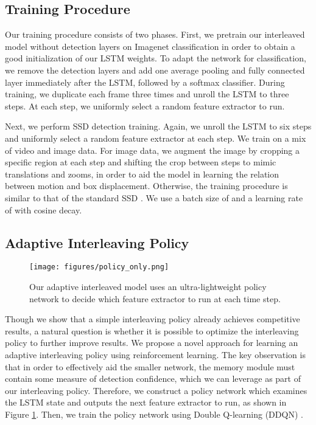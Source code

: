\documentclass[10pt,twocolumn,letterpaper]{article}
\begin{document}
\subsection{Training Procedure}
Our training procedure consists of two phases. First, we pretrain our interleaved model without detection layers on Imagenet classification in order to obtain a good initialization of our LSTM weights. To adapt the network for classification, we remove the detection layers  and add one average pooling and fully connected layer immediately after the LSTM, followed by a softmax classifier. During training, we duplicate each frame three times and unroll the LSTM to three steps. At each step, we uniformly select a random feature extractor to run.

Next, we perform SSD detection training. Again, we unroll the LSTM to six steps and uniformly select a random feature extractor at each step. We train on a mix of video and image data. For image data, we augment the image by cropping a specific region at each step and shifting the crop between steps to mimic translations and zooms, in order to aid the model in learning the relation between motion and box displacement. Otherwise, the training procedure is similar to that of the standard SSD \cite{liu2016ssd}. We use a batch size of  and a learning rate of  with cosine decay.

\subsection{Adaptive Interleaving Policy}
\label{sec:3.4}
\begin{figure}[t]
\begin{center}
  \texttt{[image: figures/policy\_only.png]}
\end{center}
\vspace{-1em}
  \caption{Our adaptive interleaved model uses an ultra-lightweight policy network to decide which feature extractor to run at each time step.}
\label{fig:rl}
\end{figure}

Though we show that a simple interleaving policy already achieves competitive results, a natural question is whether it is possible to optimize the interleaving policy to further improve results. We propose a novel approach for learning an adaptive interleaving policy using reinforcement learning. The key observation is that in order to effectively aid the smaller network, the memory module must contain some measure of detection confidence, which we can leverage as part of our interleaving policy. Therefore, we construct a policy network  which examines the LSTM state and outputs the next feature extractor to run, as shown in Figure \ref{fig:rl}. Then, we train the policy network using Double Q-learning (DDQN) \cite{van2016deep}.
\end{document}
